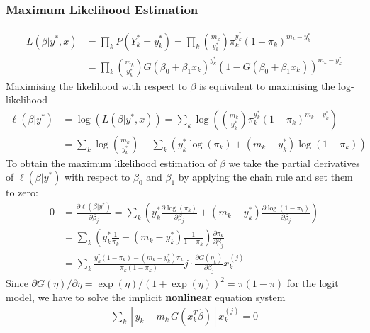 \subsubsection{Maximum Likelihood Estimation}
\begin{align*}
L\left(\beta | y^*, x\right)
 & =
\prod_k P\left(Y_k^* = y_k^*\right)
=
\prod_k \binom{m_k}{y_k^*} \pi_k^{y_k^*} (1 - \pi_k)^{m_k - y_k^*}
\\
 & =
\prod_k \binom{m_k}{y_k^*} G\left(\beta_0 + \beta_1 x_k\right)^{y_k^*}
(1 - G\left(\beta_0 + \beta_1 x_k\right))^{m_k - y_k^*}
\end{align*}
Maximising the likelihood with respect to $\beta$ is equivalent to maximising
the log-likelihood
\begin{align*}
\ell\left(\beta | y^*\right)
 & =
\log\left(L\left(\beta | y^*, x\right)\right)
=
\sum_k \log\left(\binom{m_k}{y_k^*}
\pi_k^{y_k^*} (1 - \pi_k)^{m_k - y_k^*}\right)
\\
 & =
\sum_k \log\binom{m_k}{y_k^*} +
\sum_k \left(y_k^*\log\left(\pi_k\right) +
\left(m_k - y_k^*\right)\log\left(1 - \pi_k\right)\right)
\end{align*}
To obtain the maximum likelihood estimation of $\beta$
we take the partial derivatives of $\ell(\beta | y^*)$ with respect to
$\beta_0$ and $\beta_1$ by applying the chain rule and set them to zero:
\begin{align*}
0
 & =
\frac{\partial\ell(\beta | y^*)}{\partial \beta_j}
=
\sum_k \left(y_k^* \frac{\partial \log(\pi_k)}{\partial \beta_j} +
\left(m_k - y_k^*\right)
\frac{\partial \log\left(1 - \pi_k\right)}{\partial\beta_j}\right)
\\
 & =
\sum_k \left(y_k^* \frac{1}{\pi_k} - (m_k - y_k^*) \frac{1}{1-\pi_k}\right)
\frac{\partial\pi_k}{\partial\beta_j}
\\
 & =
\sum_k \frac{y_k^* (1 - \pi_k) - (m_k - y_k^*) \pi_k}{\pi_k (1 - \pi_k)} j\cdot
\frac{\partial G(\eta_k)}{\partial\beta_j} x_k^{(j)}
\end{align*}
Since $\partial G(\eta)/\partial\eta = \exp(\eta)/(1+\exp(\eta))^2=\pi(1-\pi)$
for the logit model, we have to solve the implicit \textbf{nonlinear} equation
system
\begin{align*}
\sum_k \left[ y_k - m_k \, G\!\left(x_k^T \widehat{\beta}\right) \right]
x_k^{(j)}
=
0
\end{align*}

